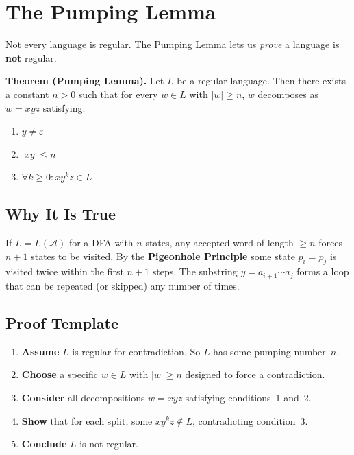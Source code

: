 \documentclass[11pt, a4paper]{article}
\theoremstyle{definition}
\theoremstyle{remark}
\newcommand{\dfa}{\mathcal{A}}
\begin{document}
\section{The Pumping Lemma}

Not every language is regular.  The Pumping Lemma lets us \emph{prove} a language is
\textbf{not} regular.

\begin{defbox}
\textbf{Theorem (Pumping Lemma).}  Let $L$ be a regular language.  Then there exists a
constant $n>0$ such that for every $w\in L$ with $|w|\geq n$, $w$ decomposes as $w=xyz$
satisfying:
\begin{enumerate}
  \item $y\neq\varepsilon$
  \item $|xy|\leq n$
  \item $\forall k\geq 0\colon xy^kz\in L$
\end{enumerate}
\end{defbox}

\subsection{Why It Is True}

If $L=L(\dfa)$ for a DFA with $n$ states, any accepted word of length $\geq n$ forces $n+1$
states to be visited.  By the \textbf{Pigeonhole Principle} some state $p_i=p_j$ is visited
twice within the first $n+1$ steps.  The substring $y=a_{i+1}\cdots a_j$ forms a loop that
can be repeated (or skipped) any number of times.

\subsection{Proof Template}

\begin{enumerate}[itemsep=3pt]
  \item \textbf{Assume} $L$ is regular for contradiction.  So $L$ has some pumping
        number~$n$.
  \item \textbf{Choose} a specific $w\in L$ with $|w|\geq n$ designed to force a
        contradiction.
  \item \textbf{Consider} all decompositions $w=xyz$ satisfying conditions~1 and~2.
  \item \textbf{Show} that for each split, some $xy^kz\notin L$, contradicting
        condition~3.
  \item \textbf{Conclude} $L$ is not regular.
\end{enumerate}
\end{document}

